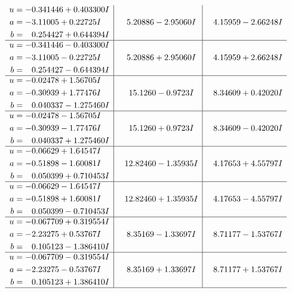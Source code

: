 \documentclass[1p]{elsarticle_modified}
\theoremstyle{definition}
\begin{document}
$$\begin{array}{c|c|c}
\begin{aligned}
u &= -0.341446 + 0.403300 I \\
a &= -3.11005 + 0.22725 I \\
b &= \phantom{-}0.254427 + 0.644394 I\end{aligned}
 & \phantom{-}5.20886 - 2.95060 I & \phantom{-}4.15959 - 2.66248 I \\ \hline\begin{aligned}
u &= -0.341446 - 0.403300 I \\
a &= -3.11005 - 0.22725 I \\
b &= \phantom{-}0.254427 - 0.644394 I\end{aligned}
 & \phantom{-}5.20886 + 2.95060 I & \phantom{-}4.15959 + 2.66248 I \\ \hline\begin{aligned}
u &= -0.02478 + 1.56705 I \\
a &= -0.30939 + 1.77476 I \\
b &= \phantom{-}0.040337 - 1.275460 I\end{aligned}
 & \phantom{-}15.1260 - 0.9723 I & \phantom{-}8.34609 + 0.42020 I \\ \hline\begin{aligned}
u &= -0.02478 - 1.56705 I \\
a &= -0.30939 - 1.77476 I \\
b &= \phantom{-}0.040337 + 1.275460 I\end{aligned}
 & \phantom{-}15.1260 + 0.9723 I & \phantom{-}8.34609 - 0.42020 I \\ \hline\begin{aligned}
u &= -0.06629 + 1.64547 I \\
a &= -0.51898 - 1.60081 I \\
b &= \phantom{-}0.050399 + 0.710453 I\end{aligned}
 & \phantom{-}12.82460 - 1.35935 I & \phantom{-}4.17653 + 4.55797 I \\ \hline\begin{aligned}
u &= -0.06629 - 1.64547 I \\
a &= -0.51898 + 1.60081 I \\
b &= \phantom{-}0.050399 - 0.710453 I\end{aligned}
 & \phantom{-}12.82460 + 1.35935 I & \phantom{-}4.17653 - 4.55797 I \\ \hline\begin{aligned}
u &= -0.067709 + 0.319554 I \\
a &= -2.23275 + 0.53767 I \\
b &= \phantom{-}0.105123 - 1.386410 I\end{aligned}
 & \phantom{-}8.35169 - 1.33697 I & \phantom{-}8.71177 - 1.53767 I \\ \hline\begin{aligned}
u &= -0.067709 - 0.319554 I \\
a &= -2.23275 - 0.53767 I \\
b &= \phantom{-}0.105123 + 1.386410 I\end{aligned}
 & \phantom{-}8.35169 + 1.33697 I & \phantom{-}8.71177 + 1.53767 I\\
 \hline 
 \end{array}$$\newpage
\end{document}
